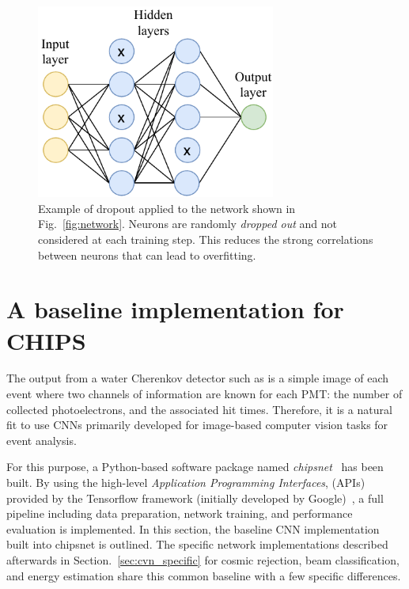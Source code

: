 \begin{figure} %
    \includegraphics[width=0.7\textwidth]{diagrams/6-cvn/dropout.pdf}
    \caption[Illustration of dropout.]
    {Example of dropout applied to the network shown in Fig.~\ref{fig:network}. Neurons are
        randomly \emph{dropped out} and not considered at each training step. This reduces the
        strong correlations between neurons that can lead to overfitting.}
    \label{fig:dropout}
\end{figure}

\section{A baseline implementation for CHIPS} %
\label{sec:cvn_baseline} %

The output from a water Cherenkov detector such as \chips is a simple image of each event where
two channels of information are known for each PMT: the number of collected photoelectrons, and
the associated hit times. Therefore, it is a natural fit to use CNNs primarily developed for
image-based computer vision tasks for \chips event analysis.

For this purpose, a Python-based software package named \emph{chipsnet}~\cite{chipsnet2020} has
been built. By using the high-level \emph{Application Programming Interfaces}, (APIs) provided by
the Tensorflow framework (initially developed by Google)~\cite{tf2015}, a full pipeline including
data preparation, network training, and performance evaluation is implemented. In this section,
the baseline CNN implementation built into chipsnet is outlined. The specific network
implementations described afterwards in Section.~\ref{sec:cvn_specific} for cosmic rejection, beam
classification, and energy estimation share this common baseline with a few specific differences.


